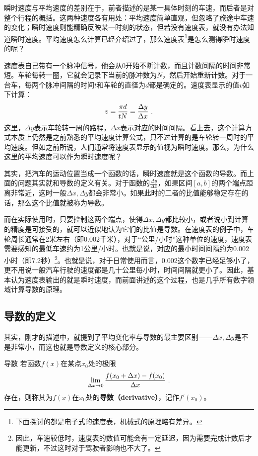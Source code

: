 瞬时速度与平均速度的差别在于，前者描述的是某一具体时刻的车速，而后者是对整个行程的概括。这两种速度各有用处：平均速度简单直观，但忽略了旅途中车速的变化；瞬时速度则能精确反映某一时刻的状态，但若没有速度表，就没有办法知道瞬时速度。平均速度怎么计算已经介绍过了，那么速度表\footnote{下面探讨的都是电子式的速度表，机械式的原理略有差异。}是怎么测得瞬时速度的呢？

速度表自己带有一个脉冲信号，他会从0开始不断计数，而且计数间隔的时间非常短。车轮每转一圈，它就会记录下当前的脉冲数为$N$，然后开始重新计数。对于一台车，每两个脉冲间隔的时间$t$和车轮的直径为$d$都是确定的。速度表显示的值$v$如下计算：
\begin{equation}
v={\pi d\over tN}=\frac{\Delta y}{\Delta x}~.
\end{equation}
这里，$\Delta y$表示车轮转一周的路程，$\Delta x$表示对应的时间间隔。看上去，这个计算方式本质上仍然是之前熟悉的平均速度计算公式，只不过计算的是车轮转一周时的平均速度。但如之前所说，人们通常将速度表显示的值视为瞬时速度。那么，为什么这里的平均速度可以作为瞬时速度呢？

其实，把汽车的运动位置当成一个函数的话，瞬时速度就是这个函数的导数。而上面的问题其实就和导数的定义有关。对于函数的$\displaystyle\frac{\Delta y}{\Delta x}$，如果区间$[a, b]$的两个端点距离非常近，这时一般$\Delta x,\Delta y$都会非常小。如果此时的二者的比值能够稳定存在的话，那么这个比值就被称为导数。

而在实际使用时，只要控制这两个端点，使得$\Delta x,\Delta y$都比较小，或者说小到计算的精度是可接受的，就可以近似地认为它们的比值是导数。在速度表的例子中，车轮周长通常在2米左右（即0.002千米），对于“公里/小时”这种单位的速度，速度表需要感知的最低车速约为1公里/小时。也就是说，对应的最小时间间隔约为0.002小时（即7.2秒）\footnote{因此，车速较低时，速度表的数值可能会有一定延迟，因为需要完成计数后才能更新，不过这时对于驾驶者影响也不大了。}。也就是说，对于日常使用而言，0.002这个数字已经足够小了，更不用说一般汽车行驶的速度都是几十公里每小时，时间间隔就更小了。因此，基本认为速度表输出的就是瞬时速度，而前面讲述的这个过程，也是几乎所有数字领域计算导数的原理。

\subsection{导数的定义}

其实，刚才的描述中，就提到了平均变化率与导数的最主要区别——$\Delta x,\Delta y$是不是非常小，而这也就是导数定义的核心部分。

\begin{definition}{导数}
若函数$f(x)$在某点$x_0$处的极限
\begin{equation}
\lim_{\Delta x\to 0}{f(x_0+\Delta x)-f(x_0)\over \Delta x}~.
\end{equation}
存在，则称其为$f(x)$在$x_0$处的\textbf{导数（derivative）}，记作$f'(x_0)$。
\end{definition}

